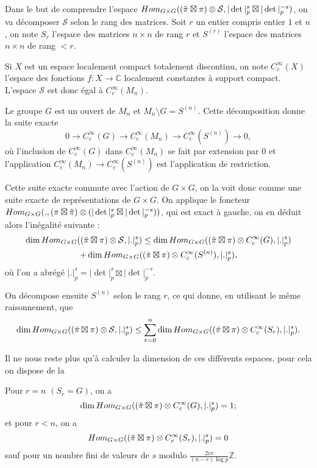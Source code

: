 Dans le but de comprendre l'espace $\operatorname{\mathnormal{Hom}}_{G \times G} ( (\tilde{\pi} \boxtimes \pi) \otimes \mathcal{S}, |\det|_p^s \boxtimes |\det|_p^{-s})$, on va décomposer $\mathcal{S}$ selon le rang des matrices. Soit $r$ un entier compris entier $1$ et $n$, on note $S_r$ l'espace des matrices $n \times n$ de rang $r$ et $S^{(r)}$ l'espace des matrices $n \times n$ de rang $< r$.

Si $X$ est un espace localement compact totalement discontinu, on note $C^\infty_c(X)$ l'espace des fonctions $f : X \rightarrow \mathbb{C}$ localement constantes à support compact. L'espace $\mathcal{S}$ est donc égal à $C^\infty_c(M_n)$.

Le groupe $G$ est un ouvert de $M_n$ et $M_n \setminus G = S^{(n)}$. Cette décomposition donne la suite exacte
\begin{equation}
\label{suiteexacte}
0 \rightarrow C^\infty_c(G) \rightarrow C^\infty_c(M_n) \rightarrow C^\infty_c(S^{(n)}) \rightarrow 0,
\end{equation}
où l'inclusion de $C^\infty_c(G)$ dans $C^\infty_c(M_n)$ se fait par extension par $0$ et l'application $C^\infty_c(M_n) \rightarrow C^\infty_c(S^{(n)})$ est l'application de restriction.

Cette suite exacte commute avec l'action de $G \times G$, on la voit donc comme une suite exacte de représentations de $G \times G$. On applique le foncteur $\operatorname{\mathnormal{Hom}}_{G \times G} (., (\pi \boxtimes \tilde{\pi}) \otimes (|\det|_p^s \boxtimes |\det|_p^{-s}))$, qui est exact à gauche, on en déduit alors l'inégalité suivante :
\begin{multline}
\dim \operatorname{\mathnormal{Hom}}_{G \times G} ((\tilde{\pi} \boxtimes \pi) \otimes \mathcal{S}, |.|_p^s) \leq \dim \operatorname{\mathnormal{Hom}}_{G \times G} ((\tilde{\pi} \boxtimes \pi) \otimes C^\infty_c(G), |.|_p^s) \\
+ \dim \operatorname{\mathnormal{Hom}}_{G \times G} ((\tilde{\pi} \boxtimes \pi) \otimes C^\infty_c(S^{(n)}), |.|_p^s),
\end{multline}
où l'on a abrégé $|.|_p^s = |\det|_p^s \boxtimes |\det|_p^{-s}$.

On décompose ensuite $S^{(n)}$ selon le rang $r$, ce qui donne, en utilisant le même raisonnement, que
\begin{equation}
\dim \operatorname{\mathnormal{Hom}}_{G \times G} ((\tilde{\pi} \boxtimes \pi) \otimes \mathcal{S}, |.|_p^s) \leq \sum_{r=0}^{n} \dim \operatorname{\mathnormal{Hom}}_{G \times G} ((\tilde{\pi} \boxtimes \pi) \otimes C^\infty_c(S_r), |.|_p^s).
\end{equation}

Il ne nous reste plus qu'à calculer la dimension de ces différents espaces, pour cela on dispose de la
\begin{proposition}
Pour $r=n$ $(S_r = G)$, on a
\begin{equation}
\dim \operatorname{\mathnormal{Hom}}_{G \times G} ( (\tilde{\pi} \boxtimes \pi) \otimes C_{c}^\infty(G), |.|_p^s) = 1;
\end{equation}
et pour $r < n$, on a
\begin{equation}
\operatorname{\mathnormal{Hom}}_{G \times G} ( (\tilde{\pi} \boxtimes \pi) \otimes C_{c}^\infty(S_r), |.|_p^s) = 0
\end{equation}
sauf pour un nombre fini de valeurs de $s$ modulo $\frac{2i\pi}{(n-r)\log p}\mathbb{Z}$.
\end{proposition}

